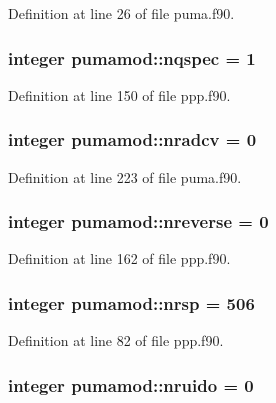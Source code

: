 \-Definition at line 26 of file puma.\-f90.

\hypertarget{classpumamod_aaee4fe4165cbc11489f204620de859b8}{
\subsubsection[{nqspec}]{\setlength{\rightskip}{0pt plus 5cm}integer {\bf pumamod\-::nqspec} = 1}}
\label{classpumamod_aaee4fe4165cbc11489f204620de859b8}


\-Definition at line 150 of file ppp.\-f90.

\hypertarget{classpumamod_a5e7e19a6f3a971a303fc7efc2676e5f1}{
\subsubsection[{nradcv}]{\setlength{\rightskip}{0pt plus 5cm}integer {\bf pumamod\-::nradcv} = 0}}
\label{classpumamod_a5e7e19a6f3a971a303fc7efc2676e5f1}


\-Definition at line 223 of file puma.\-f90.

\hypertarget{classpumamod_ad9f0e1be51ddecef14ef8259d22f110b}{
\subsubsection[{nreverse}]{\setlength{\rightskip}{0pt plus 5cm}integer {\bf pumamod\-::nreverse} = 0}}
\label{classpumamod_ad9f0e1be51ddecef14ef8259d22f110b}


\-Definition at line 162 of file ppp.\-f90.

\hypertarget{classpumamod_ae42b0619616180a024fc68c07e639f43}{
\subsubsection[{nrsp}]{\setlength{\rightskip}{0pt plus 5cm}integer {\bf pumamod\-::nrsp} = 506}}
\label{classpumamod_ae42b0619616180a024fc68c07e639f43}


\-Definition at line 82 of file ppp.\-f90.

\hypertarget{classpumamod_a8f8ac2af640bb3457498cf2ca2cf382a}{
\subsubsection[{nruido}]{\setlength{\rightskip}{0pt plus 5cm}integer {\bf pumamod\-::nruido} = 0}}
\label{classpumamod_a8f8ac2af640bb3457498cf2ca2cf382a}


